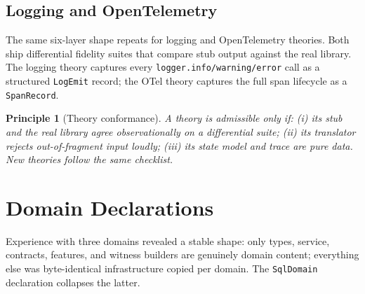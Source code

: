 \documentclass[11pt,a4paper]{article}
\newtheorem{principle}{Principle}
\begin{document}
\subsection{Logging and OpenTelemetry}

The same six-layer shape repeats for logging and OpenTelemetry
theories.  Both ship differential fidelity suites that compare stub
output against the real library.  The logging theory captures every
\texttt{logger.info/warning/error} call as a structured
\texttt{LogEmit} record; the OTel theory captures the full span
lifecycle as a \texttt{SpanRecord}.

\begin{principle}[Theory conformance]
A theory is admissible only if: (i) its stub and the real library
agree observationally on a differential suite; (ii) its translator
rejects out-of-fragment input loudly; (iii) its state model and trace
are pure data.  New theories follow the same checklist.
\end{principle}

\section{Domain Declarations}\label{sec:domains}

Experience with three domains revealed a stable shape: only types,
service, contracts, features, and witness builders are genuinely
domain content; everything else was byte-identical infrastructure
copied per domain.  The \texttt{SqlDomain} declaration collapses the
latter.
\end{document}
